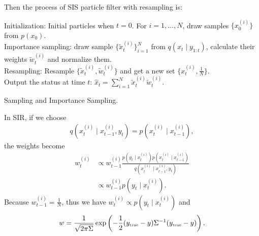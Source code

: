 Then the process of SIS particle filter with resampling is:
\begin{algorithm}[h]
\SetAlgoLined 
Initialization: Initial particles when $t=0$. For $i=1, \ldots, N$, draw samples $\{x_0^{(i)}\}$ from $p(x_0)$.\\
 {Importance sampling: draw sample $\{\tilde{x}_t ^{(i)}\}_{i=1}^N$ from $q(x_t \mid y_{1:t})$, calculate their weights $\tilde{w}_t ^{(i)}$ and normalize them. \\
Resampling: Resample $\{\tilde{x}_t ^{(i)}, \tilde{w}_t ^{(i)}\}$ and get a new set $\{x_t ^{(i)},\frac{1}{N}\}$.\\
Output the status at time $t$: $\hat{x}_t =\sum_{i=1}^{N}\tilde{x}_t ^{(i)}\tilde{w}_t ^{(i)}$.}
 \caption{Sampling and Importance Sampling.}\label{algorithmSIS}
\end{algorithm}


In SIR, if we choose
\begin{align*}
q(x_t ^{(i)}\mid x_{t-1}^{(i)},y_t ) = p(x_t ^{(i)}\mid x_{t-1}^{(i)}),
\end{align*}
the weights become
\begin{align*}
w_t ^{(i)}&\propto w_{t-1}^{(i)}\frac{ p(y_t \mid x_{t}^{(i)}) p(x_t ^{(i)}\mid x_{t-1}^{(i)}) }{q(x_t ^{(i)}\mid x_{t-1}^{(i)},y_t ) }\\
&\propto w_{t-1}^{(i)}p(y_t \mid x_{t}^{(i)}).
\end{align*}
Because $w_{t-1}^{(i)}=\frac{1}{N}$, thus we have $w_t ^{(i)} \propto p(y_t \mid x_{t}^{(i)})$ and
\begin{align*}
w=\frac{1}{\sqrt{2\pi\Sigma}}\exp\left(-\frac{1}{2} (y_{\mbox{\tiny true}}-y)\Sigma^{-1}(y_{\mbox{\tiny true}}-y)\right).
\end{align*}

